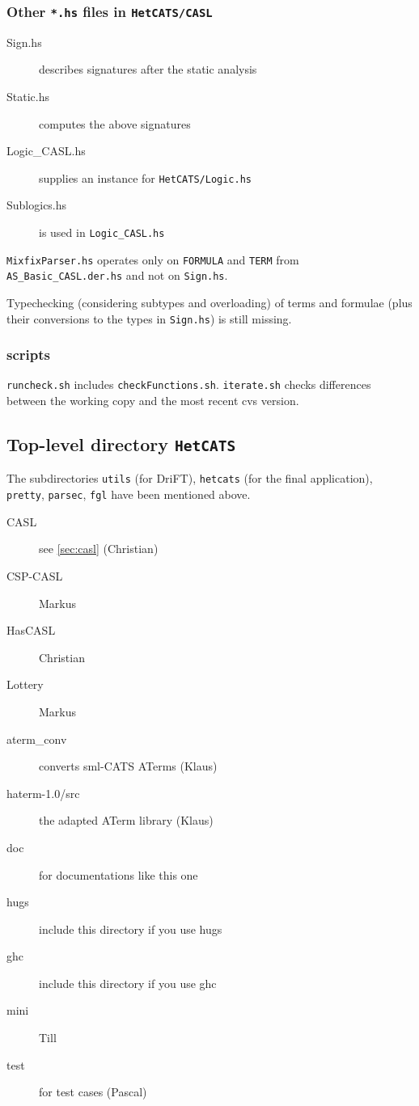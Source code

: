 \documentclass{article}
\begin{document}
\subsubsection*{Other \texttt{*.hs} files in \texttt{HetCATS/CASL}}

\begin{description}
\item[Sign.hs] describes signatures after the static analysis
\item[Static.hs] computes the above signatures
\item[Logic\_CASL.hs] supplies an instance for \texttt{HetCATS/Logic.hs}
\item[Sublogics.hs] is used in \texttt{Logic\_CASL.hs}
\end{description}
 
\texttt{MixfixParser.hs} operates only on \texttt{FORMULA} and
\texttt{TERM} from \texttt{AS\_Basic\_CASL.der.hs} and not on
\texttt{Sign.hs}. 

Typechecking (considering subtypes and overloading) of terms and
formulae (plus their conversions to the types in \texttt{Sign.hs}) is
still missing.

\subsubsection*{scripts}

\texttt{runcheck.sh} includes \texttt{checkFunctions.sh}.
\texttt{iterate.sh} checks differences between the working copy and
the most recent cvs version.


\subsection{Top-level directory \texttt{HetCATS}}

The subdirectories \texttt{utils} (for DriFT), \texttt{hetcats} (for
the final application), \texttt{pretty}, \texttt{parsec}, \texttt{fgl}
have been mentioned above.

\begin{description}
\item[CASL] see \ref{sec:casl} (Christian)
\item[CSP-CASL] Markus
\item[HasCASL] Christian
\item[Lottery] Markus
\item[aterm\_conv] converts sml-CATS ATerms (Klaus)
\item[haterm-1.0/src] the adapted ATerm library (Klaus)
\item[doc] for documentations like this one
\item[hugs] include this directory if you use hugs
\item[ghc] include this directory if you use ghc
\item[mini] Till
\item[test] for test cases (Pascal)
\end{description}
\end{document}
